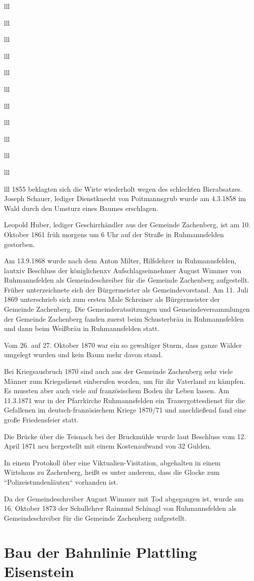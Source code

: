 \documentclass[12pt,a4pager]{book}
\begin{document}
\begin{tabuluar}{lll}
\begin{tabuluar}{lll}
\begin{tabuluar}{lll}
\begin{tabuluar}{lll}
\begin{tabuluar}{lll}
\begin{tabuluar}{lll}
\begin{tabuluar}{lll}
\begin{tabuluar}{lll}
\begin{tabuluar}{lll}
\begin{tabuluar}{lll}
\begin{tabuluar}{lll}
\begin{tabuluar}{lll}
1855 beklagten sich die Wirte wiederholt wegen des schlechten Bierabsatzes.
Joseph Schauer, lediger Dienstknecht von Poitmannsgrub wurde am 4.3.1858 im Wald
durch den Umsturz eines Baumes erschlagen.

Leopold Huber, lediger Geschirrhändler aus der Gemeinde Zachenberg, ist am 10.
Oktober 1861 früh morgens um 6 Uhr auf der Straße in Ruhmannsfelden gestorben.

Am 13.9.1868 wurde nach dem Anton Milter, Hilfslehrer in Ruhmannsfelden, lautxiv
Beschluss der königlichenxv Aufschlagseinnehmer August Wimmer von Ruhmannsfelden
als Gemeindeschreiber für die Gemeinde Zachenberg aufgestellt. Früher
unterzeichnete sich der Bürgermeister als Gemeindevorstand. Am 11. Juli 1869
unterschrieb sich zum ersten Male Schreiner als Bürgermeister der Gemeinde
Zachenberg. Die Gemeinderatssitzungen und Gemeindeversammlungen der Gemeinde
Zachenberg fanden zuerst beim Schusterbräu in Ruhmannsfelden und dann beim
Weißbräu in Ruhmannsfelden statt.

Vom 26. auf 27. Oktober 1870 war ein so gewaltiger Sturm, dass ganze Wälder
umgelegt wurden und kein Baum mehr davon stand.

Bei Kriegsausbruch 1870 sind auch aus der Gemeinde Zachenberg sehr viele Männer
zum Kriegsdienst einberufen worden, um für ihr Vaterland zu kämpfen. Es mussten
aber auch viele auf französischem Boden ihr Leben lassen. Am 11.3.1871 war in
der Pfarrkirche Ruhmannsfelden ein Trauergottesdienst für die Gefallenen im
deutsch-französischem Kriege 1870/71 und anschließend fand eine große
Friedensfeier statt.

Die Brücke über die Teisnach bei der Bruckmühle wurde laut Beschluss vom 12.
April 1871 neu hergestellt mit einem Kostenaufwand von 32 Gulden.

In einem Protokoll über eine Viktualien-Visitation, abgehalten in einem
Wirtshaus zu Zachenberg, heißt es unter anderem, dass die Glocke zum
“Polizeistundenläuten“ vorhanden ist.

Da der Gemeindeschreiber August Wimmer mit Tod abgegangen ist, wurde am 16.
Oktober 1873 der Schullehrer Raimund Schinagl von Ruhmannsfelden als
Gemeindeschreiber für die Gemeinde Zachenberg aufgestellt.

\section{Bau der Bahnlinie Plattling Eisenstein}


\end{tabuluar}
\end{tabuluar}
\end{tabuluar}
\end{tabuluar}
\end{tabuluar}
\end{tabuluar}
\end{tabuluar}
\end{tabuluar}
\end{tabuluar}
\end{tabuluar}
\end{tabuluar}
\end{tabuluar}
\end{document}
